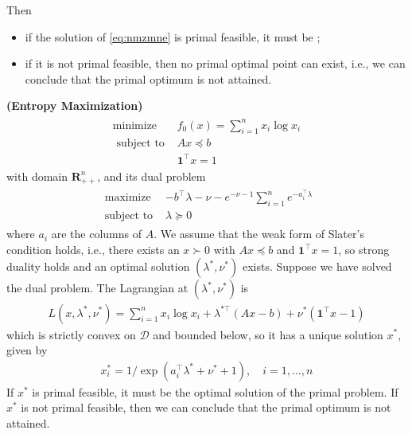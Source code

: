 \documentclass{article}
\newcommand{\bfs}[1]{\textbf{({#1}) }}
\begin{document}
Then 
\begin{itemize}
    \item if the solution of \cref{eq:nmzmne} is primal feasible, it must be ;
    \item if it is not primal feasible, then no primal optimal point can exist, i.e., we can conclude that the primal optimum is not attained.
\end{itemize}  
\begin{exma}\bfs{Entropy Maximization}
\begin{align*}
\begin{array}{ll}
\operatorname{minimize} & f_{0}(x)=\sum_{i=1}^{n} x_{i} \log x_{i} \\
\text { subject to } & A x \preceq b \\
& \mathbf{1}^{\top} x=1
\end{array}
\end{align*}
with domain $\mathbf{R}_{++}^{n}$, and its dual problem
\begin{align*}
\begin{array}{ll}
\text { maximize } & -b^{\top} \lambda-\nu-e^{-\nu-1} \sum_{i=1}^{n} e^{-a_{i}^{\top} \lambda} \\
\text { subject to } & \lambda \succeq 0
\end{array}
\end{align*}
where $a_{i}$ are the columns of $A$. We assume that the weak form of Slater's condition holds, i.e., there exists an $x \succ 0$ with $A x \preceq b$ and $\mathbf{1}^{\top} x=1$, so strong duality holds and an optimal solution $\left(\lambda^* , \nu^* \right)$ exists.
Suppose we have solved the dual problem. The Lagrangian at $\left(\lambda^* , \nu^* \right)$ is
\begin{align*}
L\left(x, \lambda^* , \nu^* \right)=\sum_{i=1}^{n} x_{i} \log x_{i}+\lambda^{*  \top}(A x-b)+\nu^* \left(\mathbf{1}^{\top} x-1\right)
\end{align*}
which is strictly convex on $\mathcal{D}$ and bounded below, so it has a unique solution $x^* $, given by
\begin{align*}
x_{i}^* =1 / \exp \left(a_{i}^{\top} \lambda^* +\nu^* +1\right), \quad i=1, \ldots, n
\end{align*}
If $x^* $ is primal feasible, it must be the optimal solution of the primal problem. If $x^* $ is not primal feasible, then we can conclude that the primal optimum is not attained.
\end{exma}
\end{document}
